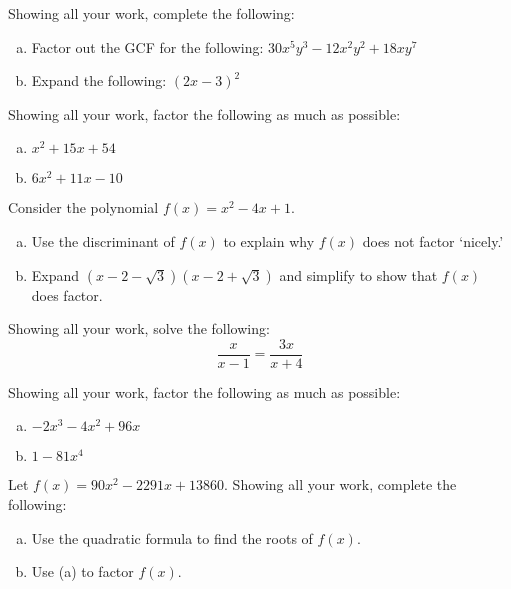 \documentclass[12pt,letterpaper]{exam}
\begin{document}
\begin{questions}
\newpage
\question[10] Showing all your work, complete the following:
	\begin{enumerate}[(a)]
	\item Factor out the GCF for the following: $30x^5 y^3 - 12x^2 y^2 + 18xy^7$
	\item Expand the following: $(2x - 3)^2$
	\end{enumerate} 



\newpage
\question[10] Showing all your work, factor the following as much as possible:
	\begin{enumerate}[(a)]
	\item $x^2 + 15x + 54$
	\item $6x^2 + 11x - 10$
	\end{enumerate} 



\newpage
\question[10] Consider the polynomial $f(x)= x^2 - 4x + 1$.
	\begin{enumerate}[(a)]
	\item Use the discriminant of $f(x)$ to explain why $f(x)$ does not factor `nicely.' 
	\item Expand $(x - 2 - \sqrt{3})(x - 2 + \sqrt{3})$ and simplify to show that $f(x)$ does factor. 
	\end{enumerate} 



\newpage
\question[10] Showing all your work, solve the following:
	\[
	\dfrac{x}{x - 1}= \dfrac{3x}{x + 4}
	\] 



\newpage
\question[10] Showing all your work, factor the following as much as possible:
	\begin{enumerate}[(a)]
	\item $-2x^3 - 4x^2 + 96x$
	\item $1 - 81x^4$
	\end{enumerate} 



\newpage
\question[10] Let $f(x)= 90x^2 - 2291x + 13860$. Showing all your work, complete the following:
	\begin{enumerate}[(a)]
	\item Use the quadratic formula to find the roots of $f(x)$.
	\item Use (a) to factor $f(x)$. 
	\end{enumerate} 


\end{questions}
\end{document}

